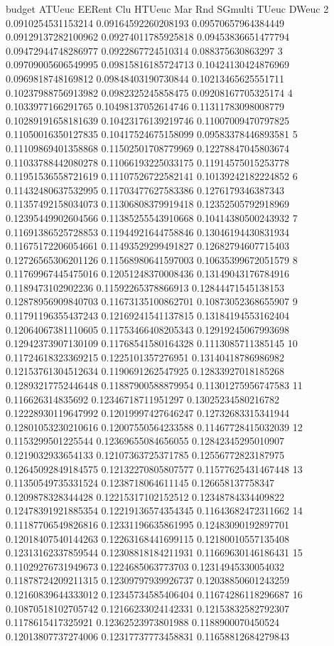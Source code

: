 budget ATUeuc EERent Clu HTUeuc Mar Rnd SGmulti TUeuc DWeuc
2 0.0910254531153214 0.09164592260208193 0.09570657964384449 0.09129137282100962 0.09274011785925818 0.09453836651477794 0.09472944748286977 0.0922867724510314 0.088375630863297
3 0.09709005606549995 0.09815816185724713 0.10424130424876969 0.0969818748169812 0.09848403190730844 0.10213465625551711 0.10237988756913982 0.0982325245858475 0.09208167705325174
4 0.1033977166291765 0.10498137052614746 0.11311783098008779 0.10289191658181639 0.10423176139219746 0.11007009470797825 0.11050016350127835 0.10417524675158099 0.09583378446893581
5 0.11109869401358868 0.11502501708779969 0.12278847045803674 0.11033788442080278 0.11066193225033175 0.11914575015253778 0.11951536558721619 0.11107526722582141 0.10139242182224852
6 0.11432480637532995 0.11703477627583386 0.1276179346387343 0.11357492158034073 0.11306808379919418 0.12352505792918969 0.12395449902604566 0.11385255543910668 0.10414380500243932
7 0.11691386525728853 0.11944921644758846 0.13046194430831934 0.11675172206054661 0.11493529299491827 0.12682794607715403 0.12726565306201126 0.11568980641597003 0.10635399672051579
8 0.11769967445475016 0.12051248370008436 0.13149043176784916 0.1189473102902236 0.11592265378866913 0.12844471545138153 0.12878956909840703 0.11673135100862701 0.10873052368655907
9 0.11791196355437243 0.12169241541137815 0.13184194553162404 0.12064067381110605 0.11753466408205343 0.12919245067993698 0.12942373907130109 0.11768541580164328 0.1113085711385145
10 0.11724618323369215 0.1225101357276951 0.13140418786986982 0.12153761304512634 0.1190691262547925 0.12833927018185268 0.12893217752446448 0.11887900588879954 0.11301275956747583
11 0.116626314835692 0.12346718711951297 0.13025234580216782 0.12228930119647992 0.12019997427646247 0.12732683315341944 0.12801053230210616 0.12007550564233588 0.11467728415032039
12 0.1153299501225544 0.12369655084656055 0.12842345295010907 0.1219032933654133 0.12107363725371785 0.12556772823187975 0.12645092849184575 0.12132270805807577 0.11577625431467448
13 0.11350549735331524 0.1238718064611145 0.126658137758347 0.1209878328344428 0.12215317102152512 0.12348784334409822 0.12478391921885354 0.12219136574354345 0.11643682472311662
14 0.11187706549826816 0.12331196635861995 0.12483090192897701 0.12018407540144263 0.12263168441699115 0.12180010557135408 0.12313162337859544 0.12308818184211931 0.11669630146186431
15 0.11029276731949673 0.1224685063773703 0.12314945330054032 0.11878724209211315 0.12309797939926737 0.12038850601243259 0.12160839644333012 0.12345734585406404 0.11674286118296687
16 0.10870518102705742 0.12166233024142331 0.12153832582792307 0.1178615417325921 0.12362523973801988 0.1188900070450524 0.12013807737274006 0.12317737773458831 0.11658812684279843
